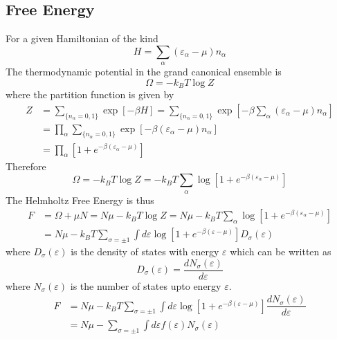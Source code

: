\documentclass[aps,prb,onecolumn,notitlepage,showpacs,floatfix,superscriptaddress]{revtex4-1}
\begin{document}
\subsection{Free Energy}
For a given Hamiltonian of the kind
\begin{equation}
H=\sum_\alpha \left(\varepsilon_\alpha - \mu \right) n_\alpha
\end{equation}
The thermodynamic potential in the grand canonical ensemble is
\begin{equation}
\Omega = -k_B T \log Z
\end{equation}
where the partition function is given by
\begin{equation}
\begin{split}
Z &= \sum_{\{n_\alpha = 0,1 \}} \exp\left[-\beta H \right] = \sum_{\{n_\alpha = 0,1 \}} \exp\left[-\beta \sum_\alpha \left(\varepsilon_\alpha - \mu \right) n_\alpha \right] \\
&= \prod_{\alpha}\sum_{\{n_\alpha = 0,1 \}} \exp\left[-\beta \left(\varepsilon_\alpha - \mu \right) n_\alpha \right] \\
&= \prod_{\alpha} \left[1+ e^{-\beta(\varepsilon_\alpha - \mu)} \right]
\end{split}
\end{equation}
Therefore 
\begin{equation}
\Omega = -k_B T \log Z = -k_B T \sum_{\alpha}\log \left[1+ e^{-\beta(\varepsilon_\alpha - \mu)} \right]
\end{equation}
The Helmholtz Free Energy is thus
\begin{equation}
\begin{split}
F&=\Omega + \mu N = N \mu -k_B T \log Z = N\mu -k_B T \sum_{\alpha} \log\left[1+ e^{-\beta(\varepsilon_\alpha - \mu)} \right] \\
&= N\mu -k_B T \sum_{\sigma=\pm 1} \int d\varepsilon \log\left[1+ e^{-\beta(\varepsilon - \mu)} \right] D_\sigma (\varepsilon)
\end{split}
\end{equation}
where $D_\sigma (\varepsilon)$ is the density of states with energy $\varepsilon$ which can be written as
\begin{equation}
D_\sigma (\varepsilon) = \dfrac{d N_\sigma (\varepsilon)}{d\varepsilon}
\end{equation}
where $N_\sigma (\varepsilon)$ is the number of states upto energy $\varepsilon$.
\begin{equation}
\begin{split}
F &= N\mu -k_B T \sum_{\sigma=\pm 1} \int d\varepsilon \log\left[1+ e^{-\beta(\varepsilon - \mu)} \right]  \dfrac{d N_\sigma (\varepsilon)}{d\varepsilon} \\
&= N\mu - \sum_{\sigma=\pm 1} \int d\varepsilon f(\varepsilon) N_\sigma (\varepsilon)
\end{split}
\end{equation}
\end{document}
